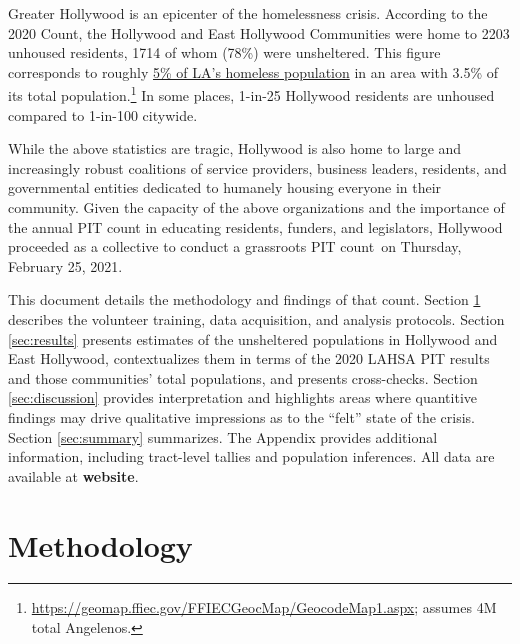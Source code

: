 \documentclass[11pt,twocolumn]{article}
\def\bfr{\bf\color{red}}
\def\Count{count}
\begin{document}
Greater Hollywood is an epicenter of the homelessness crisis. According to the 2020 Count, the 
Hollywood and East Hollywood Communities were home to 2203 unhoused residents, 1714 of whom 
(78\%) were unsheltered. This figure corresponds to roughly 
\href{https://www.lahsa.org/data?id=45-2020-homeless-count-by-community-city}
{5\% of LA's homeless population} in an area with 3.5\% of its total population.\footnote{
\url{https://geomap.ffiec.gov/FFIECGeocMap/GeocodeMap1.aspx}; assumes 4M total Angelenos.} 
In some places, 1-in-25 Hollywood residents are unhoused compared to 1-in-100 citywide.

While the above statistics are tragic, Hollywood is also home to large and increasingly robust
coalitions of service providers, business leaders, residents, and governmental entities dedicated to 
humanely housing everyone in their community. Given the capacity of the above organizations and 
the importance of the annual PIT count in educating residents, funders, and legislators, Hollywood 
proceeded as a collective to conduct a grassroots PIT \Count\ on Thursday, February 25, 2021.

This document details the methodology and findings of that \Count. 
Section \ref{sec:procedure} describes the volunteer training, data acquisition, 
and analysis protocols. Section \ref{sec:results} presents estimates of the unsheltered 
populations in Hollywood and East Hollywood, contextualizes them in terms of the 2020 
LAHSA PIT results and those communities' total populations, and presents cross-checks. 
Section \ref{sec:discussion} provides interpretation and highlights areas where quantitive findings 
may drive qualitative impressions as to the ``felt'' state of the crisis. Section \ref{sec:summary} 
summarizes. The Appendix provides additional information, including tract-level tallies and 
population inferences. All data are available at {\bfr website}.

\section{Methodology}
\label{sec:procedure}
%
%
\end{document}
